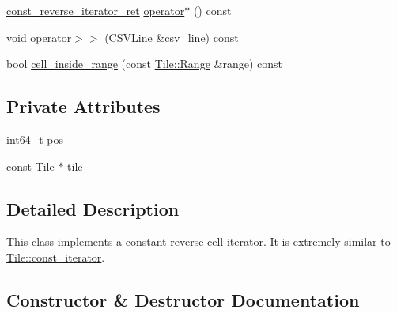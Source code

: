 \begin{DoxyCompactItemize}
\item 
\hyperlink{classTile_1_1const__reverse__iterator_1_1const__reverse__iterator__ret}{const\+\_\+reverse\+\_\+iterator\+\_\+ret} \hyperlink{classTile_1_1const__reverse__iterator_a559f8aeccc679811c9c335fbd98deab0}{operator$\ast$} () const 
\item 
void \hyperlink{classTile_1_1const__reverse__iterator_ad436b0080bdc7d045d7758d5af6ed4ee}{operator$>$$>$} (\hyperlink{classCSVLine}{C\+S\+V\+Line} \&csv\+\_\+line) const 
\item 
bool \hyperlink{classTile_1_1const__reverse__iterator_a5bb36496275e8a34d6587e1c41505093}{cell\+\_\+inside\+\_\+range} (const \hyperlink{classTile_afc4e8e753d24e2b07f4675bcd9c1dcca}{Tile\+::\+Range} \&range) const 
\end{DoxyCompactItemize}
\subsection*{Private Attributes}
\begin{DoxyCompactItemize}
\item 
int64\+\_\+t \hyperlink{classTile_1_1const__reverse__iterator_ae91ee89a6d535882aceddb8545023a8b}{pos\+\_\+}
\item 
const \hyperlink{classTile}{Tile} $\ast$ \hyperlink{classTile_1_1const__reverse__iterator_a88d8d392c4082cb083f73450eb3e712f}{tile\+\_\+}
\end{DoxyCompactItemize}


\subsection{Detailed Description}
This class implements a constant reverse cell iterator. It is extremely similar to \hyperlink{classTile_1_1const__iterator}{Tile\+::const\+\_\+iterator}. 

\subsection{Constructor \& Destructor Documentation}
\hypertarget{classTile_1_1const__reverse__iterator_a55d04cc82fd772ff7a5fa836c8e40aaa}{}
